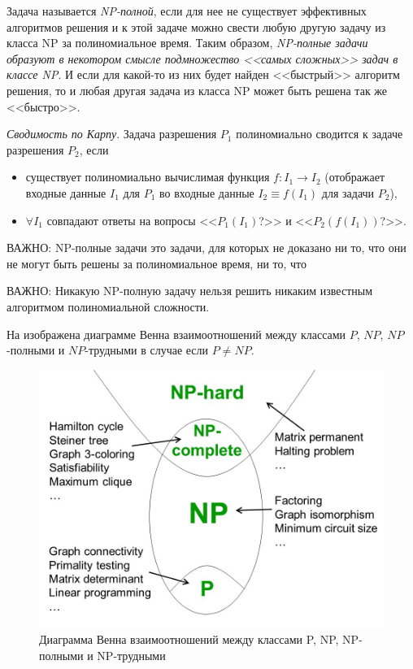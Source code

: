 \documentclass[%
	11pt,
	a4paper,
	utf8,
		]{article}
\begin{document}
Задача называется \emph{NP-полной}, если для нее не существует эффективных алгоритмов решения и к этой задаче можно свести любую другую задачу из класса NP за полиномиальное время. Таким образом, {\color{blue}\itshape NP-полные задачи образуют в некотором смысле подмножество <<самых сложных>> задач в классе NP}. И если для какой-то из них будет найден <<быстрый>> алгоритм решения, то и любая другая задача из класса NP может быть решена так же <<быстро>>.

\emph{Сводимость по Карпу}. Задача разрешения $ P_1 $ полиномиально сводится к задаче разрешения $ P_2 $, если
\begin{itemize}
	\item существует полиномиально вычислимая функция $ f: I_1 \to I_2 $ (отображает входные данные $ I_1 $ для $ P_1 $ во входные данные $ I_2 \equiv f(I_1) $ для задачи $ P_2 $),
	
	\item $ \forall I_1 $ совпадают ответы на вопросы <<$ P_1(I_1) $?>> и <<$ P_2(f(I_1)) $?>>.
\end{itemize} 

ВАЖНО: NP-полные задачи это задачи, для которых не доказано ни то, что они не могут быть решены за полиномиальное время, ни то, что 

ВАЖНО: Никакую NP-полную задачу нельзя решить никаким известным алгоритмом полиномиальной сложности.

На  изображена диаграмме Венна взаимоотношений между классами $ P $, $ NP $, $ NP $-полными и $ NP $-трудными в случае если $ P \neq NP $.

\begin{figure}[h]
	\centering
	\includegraphics[scale=0.35]{figures/np.jpg}
	\caption{ Диаграмма Венна взаимоотношений между классами P, NP, NP-полными и NP-трудными }\label{fig:np}
\end{figure}
\end{document}
